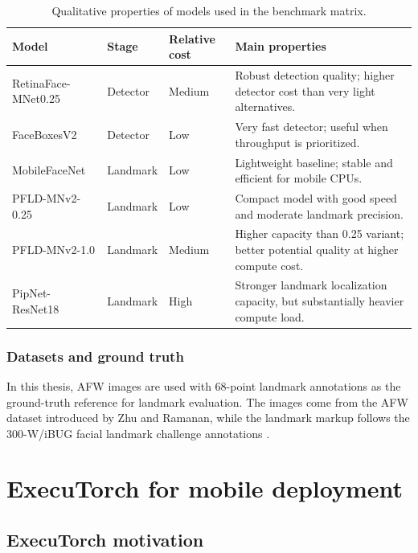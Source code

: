 \begin{table}[htbp]
\centering
\caption{Qualitative properties of models used in the benchmark matrix.}
\label{tab:model-properties-qual}
\small
\renewcommand{\arraystretch}{1.12}
\begin{tabular}{@{}>{\raggedright\arraybackslash}p{2.7cm}>{\raggedright\arraybackslash}p{2.0cm}>{\raggedright\arraybackslash}p{1.5cm}>{\raggedright\arraybackslash}p{5.6cm}@{}}
\toprule
Model & Stage & Relative cost & Main properties \\
\midrule
RetinaFace-MNet0.25 & Detector & Medium & Robust detection quality; higher detector cost than very light alternatives. \\
FaceBoxesV2 & Detector & Low & Very fast detector; useful when throughput is prioritized. \\
MobileFaceNet & Landmark & Low & Lightweight baseline; stable and efficient for mobile CPUs. \\
PFLD-MNv2-0.25 & Landmark & Low & Compact model with good speed and moderate landmark precision. \\
PFLD-MNv2-1.0 & Landmark & Medium & Higher capacity than 0.25 variant; better potential quality at higher compute cost. \\
PipNet-ResNet18 & Landmark & High & Stronger landmark localization capacity, but substantially heavier compute load. \\
\bottomrule
\end{tabular}
\end{table}

\subsection{Datasets and ground truth}

In this thesis, AFW images are used with 68-point landmark annotations as the
ground-truth reference for landmark evaluation. The images come from the AFW
dataset introduced by Zhu and Ramanan, while the landmark markup follows the
300-W/iBUG facial landmark challenge annotations
\cite{zhu2012facedetectionwild,sagonas2013_300w}.

\chapter{ExecuTorch for mobile deployment}

\section{ExecuTorch motivation}

